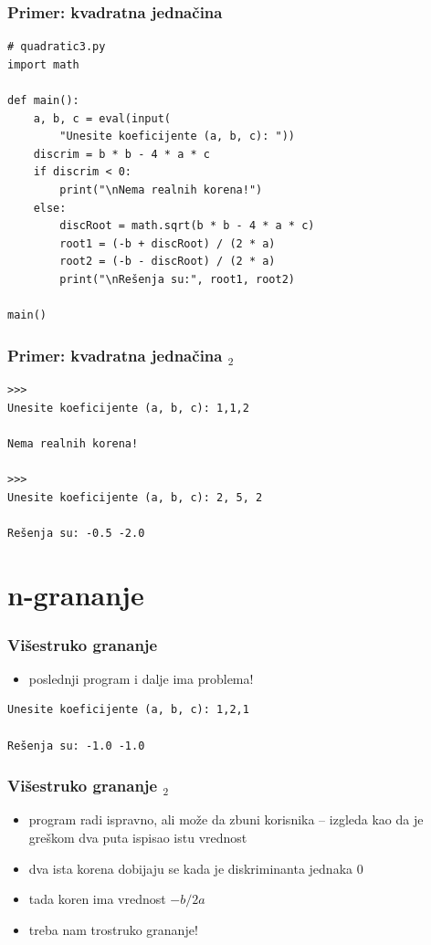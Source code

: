 \documentclass[utf8,compress,aspectratio=169]{beamer}
\begin{document}
\begin{frame}[fragile,shrink=5]
  \frametitle{Primer: kvadratna jednačina}
\begin{verbatim}
# quadratic3.py
import math

def main():
    a, b, c = eval(input(
        "Unesite koeficijente (a, b, c): "))
    discrim = b * b - 4 * a * c
    if discrim < 0:
        print("\nNema realnih korena!")
    else:
        discRoot = math.sqrt(b * b - 4 * a * c)
        root1 = (-b + discRoot) / (2 * a)
        root2 = (-b - discRoot) / (2 * a)
        print("\nRešenja su:", root1, root2)

main()
\end{verbatim}
\end{frame}

\begin{frame}[fragile]
  \frametitle{Primer: kvadratna jednačina $_2$}
\begin{verbatim}
>>>
Unesite koeficijente (a, b, c): 1,1,2

Nema realnih korena!

>>>
Unesite koeficijente (a, b, c): 2, 5, 2

Rešenja su: -0.5 -2.0
\end{verbatim}
\end{frame}

\section{n-grananje}

\begin{frame}[fragile]
  \frametitle{Višestruko grananje}
  \begin{itemize}
    \item poslednji program i dalje ima problema!
  \end{itemize}
\begin{verbatim}
Unesite koeficijente (a, b, c): 1,2,1

Rešenja su: -1.0 -1.0
\end{verbatim}
\end{frame}

\begin{frame}[fragile]
  \frametitle{Višestruko grananje $_2$}
  \begin{itemize}
    \item program radi ispravno, ali može da zbuni korisnika -- izgleda kao da je greškom dva puta ispisao istu vrednost
    \item dva ista korena dobijaju se kada je diskriminanta jednaka 0
    \item tada koren ima vrednost $-b/2a$
    \item treba nam trostruko grananje!
  \end{itemize}
\end{frame}
\end{document}
